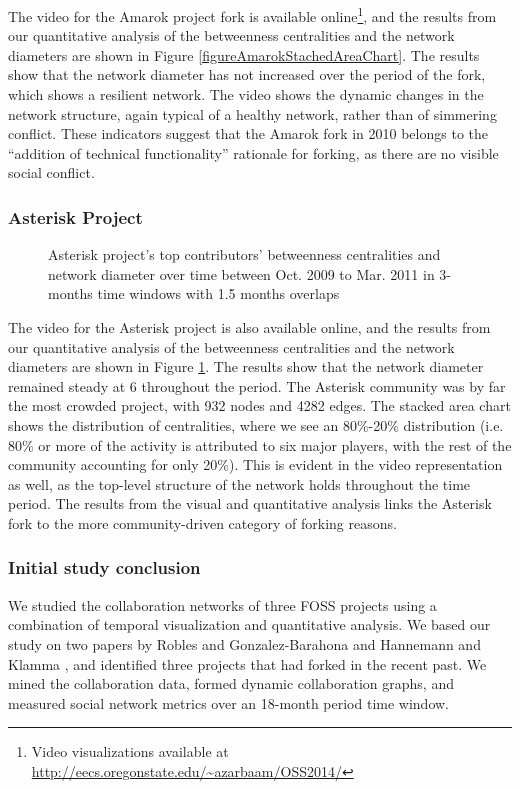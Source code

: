 \documentclass{acm_proc_article-sp}
\begin{document}
The video for the Amarok project fork is available online\footnote{Video visualizations available at \href{http://eecs.oregonstate.edu/~azarbaam/OSS2014/}{http://eecs.oregonstate.edu/\textasciitilde azarbaam/OSS2014/}}, and the results from our quantitative analysis of the betweenness centralities and the network diameters are shown in Figure \ref{figureAmarokStachedAreaChart}. The results show that the network diameter has not increased over the period of the fork, which shows a resilient network. The video shows the dynamic changes in the network structure, again typical of a healthy network, rather than of simmering conflict. These indicators suggest that the Amarok fork in 2010 belongs to the ``addition of technical functionality'' rationale for forking, as there are no visible social conflict.

\subsubsection{Asterisk Project}
\begin{figure}[!Ht]
\centering
{}
\justifying
{}
\caption{Asterisk project's top contributors' betweenness centralities and network diameter over time between Oct. 2009 to Mar. 2011 in 3-months time windows with 1.5 months overlaps}
\label{figureAsteriskStackedAreaChart}
\end{figure}

The video for the Asterisk project is also available online, and the results from our quantitative analysis of the betweenness centralities and the network diameters are shown in Figure \ref{figureAsteriskStackedAreaChart}. The results show that the network diameter remained steady at 6 throughout the period. The Asterisk community was by far the most crowded project, with 932 nodes and 4282 edges. The stacked area chart shows the distribution of centralities, where we see an 80\%-20\% distribution (i.e. 80\% or more of the activity is attributed to six major players, with the rest of the community accounting for only 20\%). This is evident in the video representation as well, as the top-level structure of the network holds throughout the time period. The results from the visual and quantitative analysis links the Asterisk fork to the more community-driven category of forking reasons.

\subsubsection{Initial study conclusion}
We studied the collaboration networks of three FOSS projects using a combination of temporal visualization and quantitative analysis. We based our study on two papers by Robles and Gonzalez-Barahona \cite{Robles} and Hannemann and Klamma \cite{Hannemann}, and identified three projects that had forked in the recent past. We mined the collaboration data, formed dynamic collaboration graphs, and measured social network metrics over an 18-month period time window.
\end{document}
